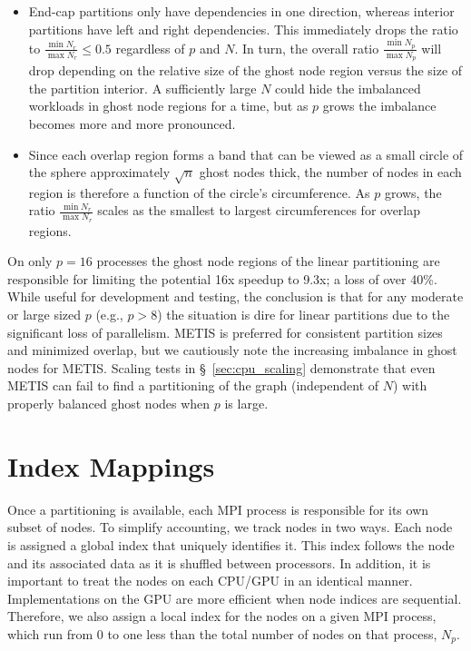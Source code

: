 \documentclass{report}
\begin{document}
\begin{itemize} 
\item End-cap partitions only have dependencies in one direction, whereas interior partitions have left and right dependencies. This immediately drops the ratio to $\frac{\min N_r}{\max N_r} \leq 0.5$ regardless of $p$ and $N$. In turn, the overall ratio $\frac{\min N_p}{\max N_p}$ will drop depending on the relative size of the ghost node region versus the size of the partition interior. A sufficiently large $N$ could hide the imbalanced workloads in ghost node regions for a time, but as $p$ grows the imbalance becomes more and more pronounced. 
\item Since each overlap region forms a band that can be viewed as a small circle of the sphere approximately $\sqrt{n}$ ghost nodes thick, the number of nodes in each region is therefore a function of the circle's circumference. As $p$ grows, the ratio $\frac{\min N_r}{\max N_r}$ scales as the smallest to largest circumferences for overlap regions. 
\end{itemize}
On only $p=16$ processes the ghost node regions of the linear partitioning are responsible for limiting the potential 16x speedup to 9.3x; a loss of over 40\%. 
While useful for development and testing, the conclusion is that for any moderate or large sized $p$ (e.g., $p > 8$) the situation is dire for linear partitions due to the significant loss of parallelism.   
METIS is preferred for consistent partition sizes and minimized overlap, but we cautiously note the increasing imbalance in ghost nodes for METIS. Scaling tests in \S~\ref{sec:cpu_scaling} demonstrate that even METIS can fail to find a partitioning of the graph (independent of $N$) with properly balanced ghost nodes when $p$ is large.  

% 


\section{Index Mappings}
\label{sec:index_mappings}

Once a partitioning is available, each MPI process is responsible for its own subset of nodes. 
To simplify accounting, we track nodes in two ways. Each node is assigned
a global index that uniquely identifies it. This index follows the node 
and its associated data as it is shuffled between processors. In addition, 
it is important to treat the nodes on each CPU/GPU in an identical manner. 
Implementations on the GPU are more efficient when node indices
are sequential. Therefore, we also assign a local index for the nodes on 
a given MPI process, which run from 0 to one less than the total number of nodes on that process, $N_p$. 
\end{document}
